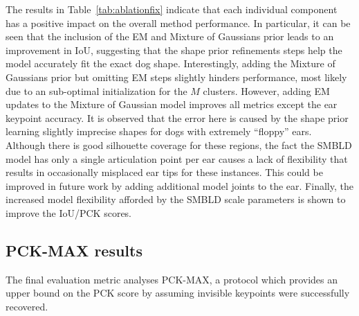 The results in Table~\ref{tab:ablationfix} indicate that each individual component has a positive impact on the overall method performance. In particular, it can be seen that the inclusion of the EM and Mixture of Gaussians prior leads to an improvement in IoU, suggesting that the shape prior refinements steps help the model accurately fit the exact dog shape. Interestingly, adding the Mixture of Gaussians prior but omitting EM steps slightly hinders performance, most likely due to an sub-optimal initialization for the $M$ clusters. However, adding EM updates to the Mixture of Gaussian model improves all metrics except the ear keypoint accuracy. It is observed that the error here is caused by the shape prior learning slightly imprecise shapes for dogs with extremely ``floppy'' ears. Although there is good silhouette coverage for these regions, the fact the SMBLD model has only a single articulation point per ear causes a lack of flexibility that results in occasionally misplaced ear tips for these instances. This could be improved in future work by adding additional model joints to the ear. Finally, the increased model flexibility afforded by the SMBLD scale parameters is shown to improve the IoU/PCK scores. 

\subsection{PCK-MAX results}

The final evaluation metric analyses PCK-MAX, a protocol which provides an upper bound on the PCK score by assuming invisible keypoints were successfully recovered.






% 


% 
% 

